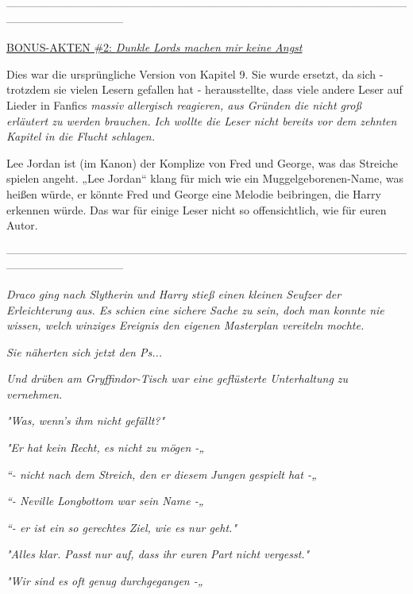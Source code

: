 {--------------------------------------------------------------------------------------------------------------------------------------------

\hfill\break

\uline{BONUS-AKTEN \#2: \emph{Dunkle Lords machen mir keine Angst}}

\hfill\break Dies war die ursprüngliche Version von Kapitel 9. Sie wurde ersetzt, da sich - trotzdem sie vielen Lesern gefallen hat - herausstellte, dass viele andere Leser auf Lieder in Fanfics \emph{massiv allergisch reagieren, aus Gründen die nicht groß erläutert zu werden brauchen. Ich wollte die Leser nicht bereits vor dem zehnten Kapitel in die Flucht schlagen.}

Lee Jordan ist (im Kanon) der Komplize von Fred und George, was das Streiche spielen angeht. „Lee Jordan“ klang für mich wie ein Muggelgeborenen-Name, was heißen würde, er könnte Fred und George eine Melodie beibringen, die Harry erkennen würde. Das war für einige Leser nicht so offensichtlich, wie für euren Autor.

--------------------------------------------------------------------------------------------------------------------------------------------

\hfill\break \emph{Draco ging nach Slytherin und Harry stieß einen kleinen Seufzer der Erleichterung aus. Es} \emph{\emph{schien}} \emph{eine sichere Sache zu sein, doch man konnte nie wissen, welch winziges Ereignis den eigenen Masterplan vereiteln mochte.}

\emph{Sie näherten sich jetzt den Ps...}

\emph{Und drüben am Gryffindor-Tisch war eine geflüsterte Unterhaltung zu vernehmen.}

\emph{\emph{"Was, wenn's ihm nicht gefällt?"}}

\emph{\emph{"Er hat kein Recht, es nicht zu mögen -„}}

\emph{\emph{“- nicht nach dem Streich, den er}} \emph{\emph{d}\emph{iesem}} \emph{\emph{Jungen}} \emph{\emph{gespielt hat -„}}

\emph{\emph{“- Neville Longbottom war sein Name -„}}

\emph{\emph{“- er ist ein so gerechtes Ziel, wie es nur geht."}}

\emph{\emph{"Alles klar. Passt nur auf, dass ihr euren}} \emph{\emph{Part}} \emph{\emph{nicht vergesst."}}

\emph{\emph{"Wir sind es oft genug durchgegangen -„}}

}
